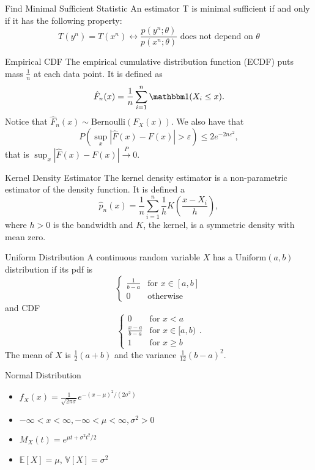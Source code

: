 \documentclass[avery5371,grid]{flashcards}
\begin{document}
\begin{flashcard}[Theorem]{Find Minimal Sufficient Statistic}
An estimator T is minimal sufficient if and only if it has the following property:
\[
T(y^n) = T(x^n) \leftrightarrow \frac{p(y^n;\theta)}{p(x^n;\theta)} \text{ does not depend on } \theta
\]
\end{flashcard}

\begin{flashcard}[Definition]{Empirical CDF}
\scriptsize
The empirical cumulative distribution function (ECDF) puts mass $\frac{1}{n}$ at each 
data point. It is defined as
\[
\hat F_n(x) = \frac{1}{n} \sum_{i=1}^n \mathbbm 1 (X_i \le x).
\]
Notice that $\hat F_n(x) \sim \text{Bernoulli}(F_X(x))$. We also have that 
\[
P\left( \sup_x |\hat F(x) - F(x) | > \varepsilon \right) \le 2e^{-2n\varepsilon^2},
\]
that is $\sup_x |\hat F(x) - F(x) | \overset{P} \longrightarrow 0$.
\end{flashcard}

\begin{flashcard}[Definition]{Kernel Density Estimator}
The kernel density estimator is a non-parametric estimator of the density function. It is defined a
\[
\hat p_n(x) = \frac{1}{n} \sum_{i=1}^n \frac{1}{h} K\left( \frac{x-X_i}{h}\right),
\]
where $h>0$ is the bandwidth and $K$, the kernel, is a symmetric density with mean zero.
\end{flashcard}


\begin{flashcard}[Definition]{Uniform Distribution}
\scriptsize
A continuous random variable $X$ has a $\text{Uniform}(a,b)$ distribution if its pdf is 
\[\begin{cases} \frac{1}{b - a} & \text{for } x \in [a,b] \\ 0 & \text{otherwise} \end{cases}\]
and CDF
\[\begin{cases} 0 & \text{for } x < a \\ \frac{x-a}{b-a} & \text{for } x \in [a,b) \\ 1 & \text{for } x \ge b \end{cases}.\]
The mean of $X$ is $\frac{1}{2}(a+b)$ and the variance $\tfrac{1}{12}(b-a)^2$.

\end{flashcard}

\begin{flashcard}[Definition]{Normal Distribution}
\begin{itemize}
\item $f_X(x) = \frac{1}{\sqrt{2\pi \sigma}} e^{-(x-\mu)^2 / (2\sigma^2)}$
\item $- \infty < x < \infty, - \infty < \mu < \infty, \sigma^2 > 0$
\item $M_{X}\left(t\right) = e^{\mu t + \sigma^2 t^2 / 2}$
\item $\mathbb{E} \left[ X \right] = \mu$, $\mathbb{V}\left[X\right]= \sigma^2$
\end{itemize}
\end{flashcard}
\end{document}
